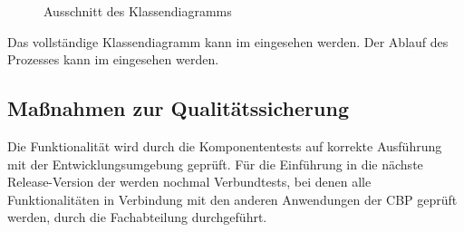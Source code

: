 \begin{figure}[htb]
	\centering
	\caption{Ausschnitt des Klassendiagramms}
\end{figure}

Das vollständige Klassendiagramm kann im  eingesehen werden.
Der Ablauf des Prozesses kann im  eingesehen werden.

\subsection{Maßnahmen zur Qualitätssicherung}
\label{sec:Qualitaetssicherung}

Die Funktionalität  wird durch die Komponententests auf korrekte Ausführung mit der Entwicklungsumgebung geprüft. Für die Einführung in die nächste Release-Version der \CBPAD werden nochmal Verbundtests, bei denen alle Funktionalitäten in Verbindung mit den anderen Anwendungen der \acs{CBP}\xspace geprüft werden, durch die Fachabteilung durchgeführt.



